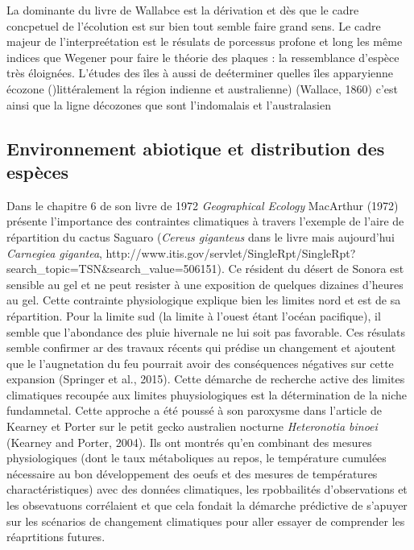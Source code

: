 La dominante du livre de Wallabce est la dérivation et dès que le cadre
concpetuel de l'écolution est sur bien tout semble faire grand sens. Le
cadre majeur de l'interpreétation est le résulats de porcessus profone
et long les même indices que Wegener pour faire le théorie des plaques :
la ressemblance d'espèce très éloignées. L'études des îles à aussi de
deéterminer quelles îles apparyienne écozone ()littéralement la région
indienne et australienne) (Wallace, 1860) c'est ainsi que la ligne
décozones que sont l'indomalais et l'australasien

\subsection*{Environnement abiotique et distribution des
espèces}\label{environnement-abiotique-et-distribution-des-espuxe8ces}

Dans le chapitre 6 de son livre de 1972 \emph{Geographical Ecology}
MacArthur (1972) présente l'importance des contraintes climatiques à
travers l'exemple de l'aire de répartition du cactus Saguaro
(\emph{Cereus giganteus} dans le livre mais aujourd'hui \emph{Carnegiea
gigantea},
http://www.itis.gov/servlet/SingleRpt/SingleRpt?search\_topic=TSN\&search\_value=506151).
Ce résident du désert de Sonora est sensible au gel et ne peut resister
à une exposition de quelques dizaines d'heures au gel. Cette contrainte
physiologique explique bien les limites nord et est de sa répartition.
Pour la limite sud (la limite à l'ouest étant l'océan pacifique), il
semble que l'abondance des pluie hivernale ne lui soit pas favorable.
Ces résulats semble confirmer ar des travaux récents qui prédise un
changement et ajoutent que le l'augnetation du feu pourrait avoir des
conséquences négatives sur cette expansion (Springer et al., 2015).
Cette démarche de recherche active des limites climatiques recoupée aux
limites phuysiologiques est la détermination de la niche fundamnetal.
Cette approche a été poussé à son paroxysme dans l'article de Kearney et
Porter sur le petit gecko australien nocturne \emph{Heteronotia binoei}
(Kearney and Porter, 2004). Ils ont montrés qu'en combinant des mesures
physiologiques (dont le taux métaboliques au repos, le température
cumulées nécessaire au bon développement des oeufs et des mesures de
températures charactéristiques) avec des données climatiques, les
rpobbailités d'observations et les obsevatuons corrélaient et que cela
fondait la démarche prédictive de s'apuyer sur les scénarios de
changement climatiques pour aller essayer de comprender les réaprtitions
futures.

